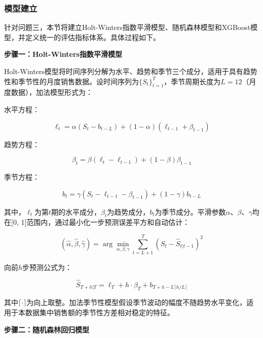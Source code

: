 

\subsubsection{模型建立}

针对问题三，本节将建立Holt-Winters指数平滑模型、随机森林模型和XGBoost模型，并定义统一的评估指标体系。具体过程如下。

\textbf{步骤一：Holt-Winters指数平滑模型}

Holt-Winters模型将时间序列分解为水平、趋势和季节三个成分，适用于具有趋势性和季节性的月度销售数据。设时间序列为$\{S_t\}_{t=1}^{T}$，季节周期长度为$L=12$（月度数据），加法模型形式为：

水平方程：

\begin{equation}
\ell_t = \alpha (S_t - b_{t-L}) + (1-\alpha)(\ell_{t-1} + \beta_{t-1})
\end{equation}

趋势方程：

\begin{equation}
\beta_t = \beta (\ell_t - \ell_{t-1}) + (1-\beta)\beta_{t-1}
\end{equation}

季节方程：

\begin{equation}
b_t = \gamma (S_t - \ell_{t-1} - \beta_{t-1}) + (1-\gamma)b_{t-L}
\end{equation}

其中，$\ell_t$为第$t$期的水平成分，$\beta_t$为趋势成分，$b_t$为季节成分。平滑参数$\alpha$、$\beta$、$\gamma$均在[0, 1]范围内，通过最小化一步预测误差平方和自动估计：

\begin{equation}
(\hat{\alpha}, \hat{\beta}, \hat{\gamma}) = \arg\min_{\alpha,\beta,\gamma} \sum_{t=L+1}^{T} (S_t - \hat{S}_{t|t-1})^2
\end{equation}

向前$h$步预测公式为：

\begin{equation}
\hat{S}_{T+h|T} = \ell_T + h \cdot \beta_T + b_{T+h-L\lceil h/L \rceil}
\end{equation}

其中$\lceil \cdot \rceil$为向上取整。加法季节性模型假设季节波动的幅度不随趋势水平变化，适用于本数据集中销售额的季节性方差相对稳定的特征。

\textbf{步骤二：随机森林回归模型}


